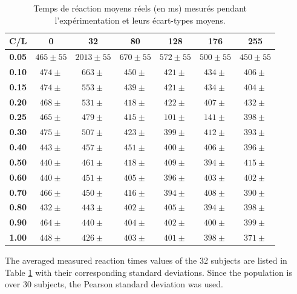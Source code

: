 	\begin{table}[h]	
		\centering
		\caption{Temps de réaction moyens réels (en ms) mesurés pendant l'expérimentation et leurs écart-types moyens.}
		\label{tab:real_reaction_times}
		\begin{tabular}{c|cccccc}
			\textbf{C/L} & \textbf{0} & \textbf{32} & \textbf{80} & \textbf{128} & \textbf{176} & \textbf{255}\\
			\hline
			\textbf{0.05} & $465 \pm 55$ & $2013 \pm 55$ & $670 \pm 55$ & $572 \pm 55$ & $500 \pm 55$ & $450 \pm 55$\\
			\textbf{0.10} & $474 \pm $ & $663 \pm $ & $450 \pm $ & $421 \pm $ & $434 \pm $ & $406 \pm $\\
			\textbf{0.15} & $474 \pm $ & $553 \pm $ & $439 \pm $ & $421 \pm $ & $434 \pm $ & $404 \pm $\\
			\textbf{0.20} & $468 \pm $ & $531 \pm $ & $418 \pm $ & $422 \pm $ & $407 \pm $ & $432 \pm $\\
			\textbf{0.25} & $465 \pm $ & $479 \pm $ & $415 \pm $ & $101 \pm $ & $141 \pm $ & $398 \pm $\\
			\textbf{0.30} & $475 \pm $ & $507 \pm $ & $423 \pm $ & $399 \pm $ & $412 \pm $ & $393 \pm $\\
			\textbf{0.40} & $443 \pm $ & $457 \pm $ & $451 \pm $ & $400 \pm $ & $406 \pm $ & $396 \pm $\\
			\textbf{0.50} & $440 \pm $ & $461 \pm $ & $418 \pm $ & $409 \pm $ & $394 \pm $ & $415 \pm $\\
			\textbf{0.60} & $440 \pm $ & $451 \pm $ & $405 \pm $ & $396 \pm $ & $403 \pm $ & $402 \pm $\\
			\textbf{0.70} & $466 \pm $ & $450 \pm $ & $416 \pm $ & $394 \pm $ & $408 \pm $ & $390 \pm $\\
			\textbf{0.80} & $432 \pm $ & $443 \pm $ & $402 \pm $ & $405 \pm $ & $394 \pm $ & $398 \pm $\\
			\textbf{0.90} & $464 \pm $ & $440 \pm $ & $404 \pm $ & $402 \pm $ & $400 \pm $ & $399 \pm $\\
			\textbf{1.00} & $448 \pm $ & $426 \pm $ & $403 \pm $ & $401 \pm $ & $398 \pm $ & $371 \pm $\\
		\end{tabular}
	\end{table}
	
	\par The averaged measured reaction times values of the 32 subjects are listed in Table \ref{tab:real_reaction_times} with their corresponding standard deviations. Since the population is over 30 subjects, the Pearson standard deviation was used.
	

